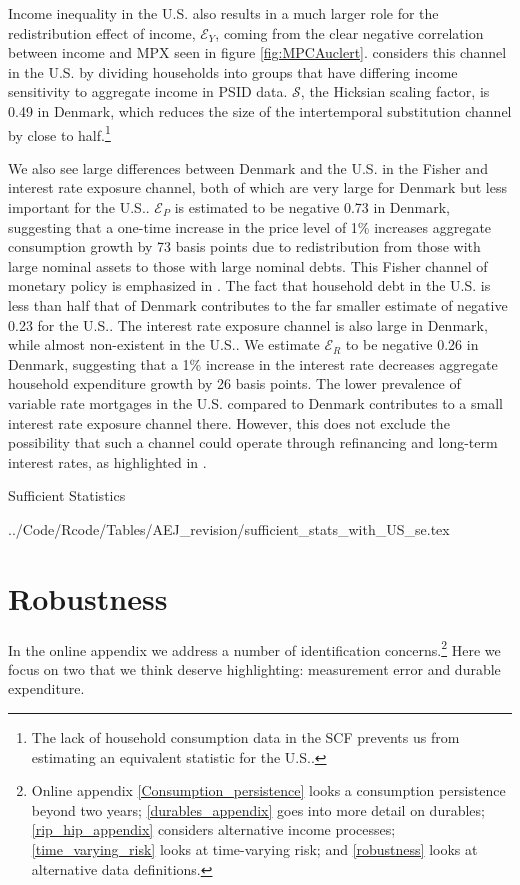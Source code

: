 \documentclass[titlepage]{\econtex}\newcommand{\texname}{ConsumptionHeterogeneity}
\newcommand{\tabdir}{../Code/Rcode/Tables/AEJ_revision}
\begin{document}
	Income inequality in the U.S. also results in a much larger role for the redistribution effect of income, $\mathcal{E}_Y$, coming from the clear negative correlation between income and MPX seen in figure \ref{fig:MPCAuclert}. \cite{patterson_2019} considers this channel in the U.S. by dividing households into groups that have differing income sensitivity to aggregate income in PSID data. $\mathcal{S}$, the Hicksian scaling factor, is 0.49 in Denmark, which reduces the size of the intertemporal substitution channel by close to half.\footnote{The lack of household consumption data in the SCF prevents us from estimating an equivalent statistic for the U.S..}
	
	We also see large differences between Denmark and the U.S. in the Fisher and interest rate exposure channel, both of which are very large for Denmark but less important for the U.S.. $\mathcal{E}_P$ is estimated to be  negative 0.73 in Denmark, suggesting that a one-time increase in the price level of 1\% increases aggregate consumption growth by 73 basis points due to redistribution from those with large nominal assets to those with large nominal debts. This Fisher channel of monetary policy is emphasized in \cite{doepke_inflation_2006}. The fact that household debt in the U.S. is less than half that of Denmark contributes to the far smaller estimate of negative 0.23 for the U.S.. The interest rate exposure channel is also large in Denmark, while almost non-existent in the U.S.. We estimate  $\mathcal{E}_R$ to be  negative 0.26 in Denmark, suggesting that a 1\% increase in the interest rate decreases aggregate household expenditure growth by 26 basis points. The lower prevalence of variable rate mortgages in the U.S. compared to Denmark contributes to a small interest rate exposure channel there. However, this does not exclude the possibility that such a channel could operate through refinancing and long-term interest rates, as highlighted in \cite{eichenbaum_2018}.
	\begin{center}
		\begin{table}
			\caption{Sufficient Statistics}
			\label{table:suff_stats}
			\begin{center}
				 \tabdir/sufficient_stats_with_US_se.tex
			\end{center}
		\end{table}
	\end{center}
	
	\section{Robustness}
	\label{threats_to_identification}
	In the online appendix we address a number of identification concerns.\footnote{Online appendix \ref{Consumption_persistence} looks a consumption persistence beyond two years; \ref{durables_appendix} goes into more detail on durables; \ref{rip_hip_appendix} considers alternative income processes; \ref{time_varying_risk} looks at time-varying risk; and \ref{robustness} looks at alternative data definitions.} Here we focus on two that we think deserve highlighting: measurement error and durable expenditure.
	
\end{document}
